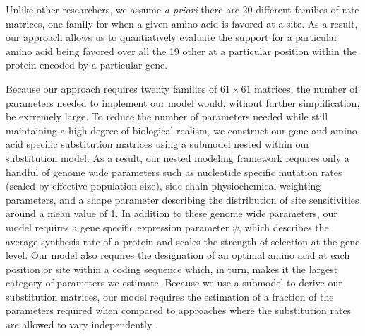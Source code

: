 \documentclass{article}
\begin{document}
Unlike other researchers, we assume \emph{a priori} there are 20 different families of rate matrices, one family for when a given amino acid is favored at a site.
As a result, our approach allows us to quantiatively evaluate the support for a particular amino acid being favored over all the 19 other at a particular position within the protein encoded by a particular gene.

Because our approach requires twenty families of $61 \times 61$ matrices, the number of parameters needed to implement our model would, without further simplification, be extremely large.
To reduce the number of parameters needed while still maintaining a high degree of biological realism, we construct our gene and amino acid specific substitution matrices using a submodel nested within our substitution model.
As a result, our nested modeling framework requires only a handful of genome wide parameters such as nucleotide specific mutation rates (scaled by effective population size), side chain physiochemical weighting parameters, and a shape parameter describing the distribution of site sensitivities around a mean value of 1.
In addition to these genome wide parameters, our model requires a gene specific expression parameter $\psi$, which describes the average synthesis rate of a protein and scales the strength of selection at the gene level.
Our model also requires the designation of an optimal amino acid at each position or site within a coding sequence which, in turn, makes it the largest category of parameters we estimate.
Because we use a submodel to derive our substitution matrices, our model requires the estimation of a fraction of the parameters required when compared to approaches where the substitution rates are allowed to vary independently  \citep{HalpernAndBruno1998,LartillotAndPhilippe2004,RodrigueAndLartillot2014}.
\end{document}
